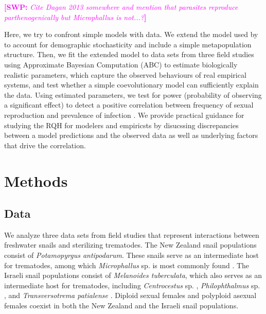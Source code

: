 \documentclass{article}\usepackage[]{graphicx}\usepackage[]{color}
\newcommand{\comment}[3]{\textcolor{#1}{\textbf{[#2: }\textit{#3}\textbf{]}}}
\newcommand{\swp}[1]{\comment{magenta}{SWP}{#1}}
\begin{document}
\swp{Cite Dagan 2013 somewhere and mention that parasites reproduce parthenogenically but Microphallus is not...?}

Here, we try to confront simple models with data.
We extend the model used by \cite{lively2010epidemiological} to account for 
demographic stochasticity and include a simple metapopulation structure.
Then, we fit the extended model to data sets from three field studies 
\citep{dagan2013clonal, mckone2016fine, vergara2014infection} 
using Approximate Bayesian Computation (ABC) to estimate biologically realistic 
parameters, which capture the observed behaviours of real empirical systems, and
test whether a simple coevolutionary model can sufficiently explain the data.
Using estimated parameters, we test for power (probability of observing a 
significant effect) to detect a positive correlation between frequency of
sexual reproduction and prevalence of infection \cite{lively2001trematode}.
We provide practical guidance for studying the RQH for modelers and empiricsts
by disucssing discrepancies between a model predictions and the observed data
as well as underlying factors that drive the correlation.

\section{Methods}

\subsection{Data}

We analyze three data sets from field studies \citep{vergara2014infection, mckone2016fine, dagan2013clonal} that represent interactions between freshwater snails and sterilizing trematodes.
The New Zealand snail populations \citep{vergara2014infection, mckone2016fine} consist of \textit{Potamopyrgus antipodarum}. These snails serve as an intermediate host for trematodes, 
among which \textit{Microphallus} sp. is most commonly found \citep{winterbourn1974larval, lively1987evidence}.
The Israeli snail populations \citep{dagan2013clonal} consist of \textit{Melanoides tuberculata}, which also serves as an intermediate host for trematodes, including \textit{Centrocestus} sp. \citep{ben2005spatial}, \textit{Philophthalmus} sp. \citep{ben2006first}, and \textit{Transversotrema patialense} \citep{ben2005differential}.
Diploid sexual females and polyploid asexual females coexist in both the New Zealand \citep{phillips1989genetics, wallace1992parthenogenesis, dybdahl1995diverse} and the Israeli \citep{samadi1999microsatellite} snail populations.
\end{document}
